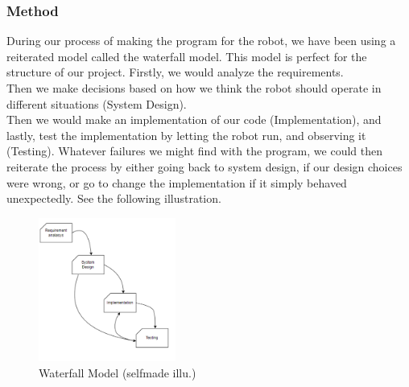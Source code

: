 \documentclass[conference]{IEEEtran}
\begin{document}
\subsubsection{Method}\label{method}
During our process of making the program for the robot, we have been using a reiterated model called the waterfall model.
This model is perfect for the structure of our project. Firstly, we would analyze the requirements. \\
Then we make decisions based on how we think the robot should operate in different situations (System Design).\\
Then we would make an implementation of our code (Implementation), and lastly, test the implementation by 
letting the robot run, and observing it (Testing). Whatever failures we might find with the program, 
we could then reiterate the process by either going back to system design, if our design choices were wrong, 
or go to change the implementation if it simply behaved unexpectedly. See the following illustration.\\
\begin{figure}[h] %
    \centering
    \includegraphics[width=0.4\textwidth]{waterfallmodel.png}
    \caption{Waterfall Model (selfmade illu.)}
\end{figure} 
\\
\end{document}
